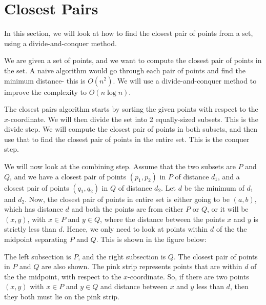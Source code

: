 \documentclass[a4paper, openany]{memoir}
\begin{document}
\section{Closest Pairs}
In this section, we will look at how to find the closest pair of points from a set, using a divide-and-conquer method.

We are given a set of points, and we want to compute the closest pair of points in the set. A naive algorithm would go through each pair of points and find the minimum distance- this is $O(n^2)$. We will use a divide-and-conquer method to improve the complexity to $O(n \log n)$.

The closest pairs algorithm starts by sorting the given points with respect to the $x$-coordinate. We will then divide the set into 2 equally-sized subsets. This is the divide step. We will compute the closest pair of points in both subsets, and then use that to find the closest pair of points in the entire set. This is the conquer step.

We will now look at the combining step. Assume that the two subsets are $P$ and $Q$, and we have a closest pair of points $(p_1, p_2)$ in $P$ of distance $d_1$, and a closest pair of points $(q_1, q_2)$ in $Q$ of distance $d_2$. Let $d$ be the minimum of $d_1$ and $d_2$. Now, the closest pair of points in entire set is either going to be $(a, b)$, which has distance $d$ and both the points are from either $P$ or $Q$, or it will be $(x, y)$, with $x \in P$ and $y \in Q$, where the distance between the points $x$ and $y$ is strictly less than $d$. Hence, we only need to look at points within $d$ of the the midpoint separating $P$ and $Q$. This is shown in the figure below:
\begin{figure}[H]
    \centering
\end{figure}
\noindent The left subsection is $P$, and the right subsection is $Q$. The closest pair of points in $P$ and $Q$ are also shown. The pink strip represents points that are within $d$ of the the midpoint, with respect to the $x$-coordinate. So, if there are two points $(x, y)$ with $x \in P$ and $y \in Q$ and distance between $x$ and $y$ less than $d$, then they both must lie on the pink strip.
\end{document}
